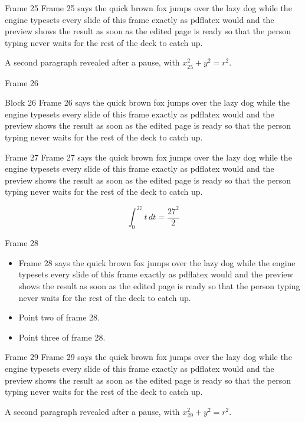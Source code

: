\documentclass{beamer}
\begin{document}
\begin{frame}{Frame 25}
  Frame 25 says the quick brown fox jumps over the lazy dog while the engine typesets every slide of this frame exactly as pdflatex would and the preview shows the result as soon as the edited page is ready so that the person typing never waits for the rest of the deck to catch up.
  \pause

  A second paragraph revealed after a pause, with $x_{25}^2 + y^2 = r^2$.
\end{frame}
\begin{frame}{Frame 26}
  \begin{block}{Block 26}
    Frame 26 says the quick brown fox jumps over the lazy dog while the engine typesets every slide of this frame exactly as pdflatex would and the preview shows the result as soon as the edited page is ready so that the person typing never waits for the rest of the deck to catch up.
  \end{block}
\end{frame}
\begin{frame}{Frame 27}
  Frame 27 says the quick brown fox jumps over the lazy dog while the engine typesets every slide of this frame exactly as pdflatex would and the preview shows the result as soon as the edited page is ready so that the person typing never waits for the rest of the deck to catch up.

  \[ \int_0^{27} t\,dt = \frac{27^2}{2} \]
\end{frame}
\begin{frame}{Frame 28}
  \begin{itemize}
    \item<1-> Frame 28 says the quick brown fox jumps over the lazy dog while the engine typesets every slide of this frame exactly as pdflatex would and the preview shows the result as soon as the edited page is ready so that the person typing never waits for the rest of the deck to catch up.
    \item<2-> Point two of frame 28.
    \item<3-> Point three of frame 28.
  \end{itemize}
\end{frame}
\begin{frame}{Frame 29}
  Frame 29 says the quick brown fox jumps over the lazy dog while the engine typesets every slide of this frame exactly as pdflatex would and the preview shows the result as soon as the edited page is ready so that the person typing never waits for the rest of the deck to catch up.
  \pause

  A second paragraph revealed after a pause, with $x_{29}^2 + y^2 = r^2$.
\end{frame}
\end{document}
